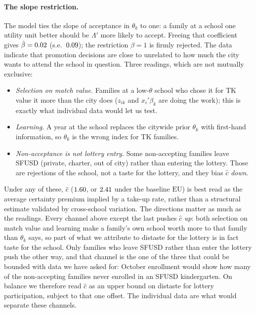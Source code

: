 \documentclass{article}
\begin{document}
\paragraph{The slope restriction.} The model ties the slope of acceptance in $\theta_k$ to one: a family at a school one utility unit better should be $\Lambda'$ more likely to accept. Freeing that coefficient gives $\hat\beta = 0.02$ (s.e.\ $0.09$); the restriction $\beta = 1$ is firmly rejected. The data indicate that promotion decisions are close to unrelated to how much the city wants to attend the school in question. Three readings, which are not mutually exclusive:
\begin{itemize}
    \item \emph{Selection on match value.} Families at a low-$\theta$ school who chose it for TK value it more than the city does ($z_{ik}$ and $x_i'\beta_k$ are doing the work); this is exactly what individual data would let us test.
    \item \emph{Learning.} A year at the school replaces the citywide prior $\theta_k$ with first-hand information, so $\theta_k$ is the wrong index for TK families.
    \item \emph{Non-acceptance is not lottery entry.} Some non-accepting families leave SFUSD (private, charter, out of city) rather than entering the lottery. Those are rejections of the school, not a taste for the lottery, and they bias $\hat{c}$ \emph{down}.
\end{itemize}
Under any of these, $\hat{c}$ ($1.60$, or $2.41$ under the baseline $\mathrm{EU}$) is best read as the average certainty premium implied by a \numTakeup{} take-up rate, rather than a structural estimate validated by cross-school variation. The directions matter as much as the readings. Every channel above except the last pushes $\hat{c}$ \emph{up}: both selection on match value and learning make a family's own school worth more to that family than $\theta_k$ says, so part of what we attribute to distaste for the lottery is in fact taste for the school. Only families who leave SFUSD rather than enter the lottery push the other way, and that channel is the one of the three that could be bounded with data we have asked for: October enrollment would show how many of the \numNonAccepting{} non-accepting families never enrolled in an SFUSD kindergarten. On balance we therefore read $\hat{c}$ as an upper bound on distaste for lottery participation, subject to that one offset. The individual data are what would separate these channels.
\end{document}
